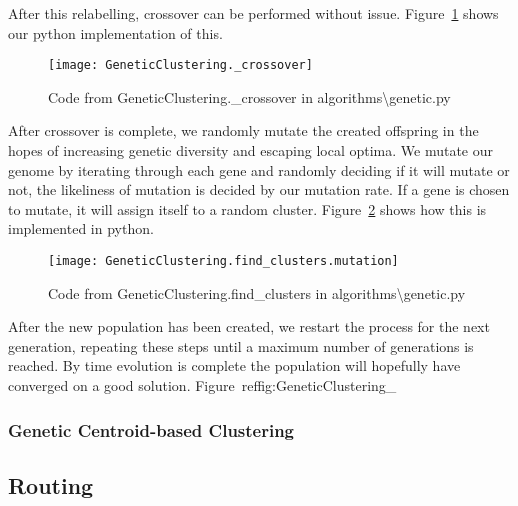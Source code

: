 \noindent
After this relabelling, crossover can be performed without issue.
Figure~\ref{fig:GeneticClustering._crossover} shows our python implementation of this.
\begin{figure}[H]
    \centering
    \texttt{[image: GeneticClustering.\_crossover]}
    \caption{Code from GeneticClustering.\_crossover in algorithms\textbackslash genetic.py}\label{fig:GeneticClustering._crossover}
\end{figure}

After crossover is complete, we randomly mutate the created offspring in the hopes of increasing genetic diversity
and escaping local optima.
We mutate our genome by iterating through each gene and randomly deciding if it will mutate or not, the likeliness
of mutation is decided by our mutation rate.
If a gene is chosen to mutate, it will assign itself to a random cluster.
Figure~\ref{fig:GeneticClustering.find_clusters.mutation} shows how this is implemented in python.
\begin{figure}[H]
    \centering
    \texttt{[image: GeneticClustering.find\_clusters.mutation]}
    \caption{Code from GeneticClustering.find\_clusters in algorithms\textbackslash genetic.py}\label{fig:GeneticClustering.find_clusters.mutation}
\end{figure}

\noindent
After the new population has been created, we restart the process for the next generation, repeating these steps
until a maximum number of generations is reached.
By time evolution is complete the population will hopefully have converged on a good solution.
Figure~ref{fig:GeneticClustering_}

\noindent
{}

\subsubsection{Genetic Centroid-based Clustering}

\subsection{Routing}\label{subsec:routing}
